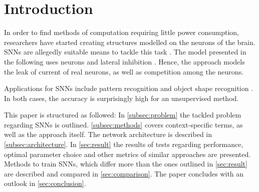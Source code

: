 \section{Introduction}

In order to find methods of computation requiring little power consumption, 
researchers have started creating structures modelled on the neurons of the brain.
\acp{SNN} are allegedly suitable means to tackle this task \cite{SNN}.
The model presented in the following uses  neurons and lateral inhibition \cite{SNN}.
Hence, the approach models the leak of current of real neurons, as well as competition among the neurons.

Applications for \acp{SNN} include pattern recognition \cite{SNN} and object shape recognition \cite{object_detection_SNN,multi_scale_STDP}.
In both cases, the accuracy is surprisingly high for an unsupervised method.

This paper is structured as followed:
In \autoref{subsec:problem} the tackled problem regarding \acp{SNN} is outlined.
\autoref{subsec:methods} covers context-specific terms, as well as the approach itself.
The network architecture is described in \autoref{subsec:architecture}.
In \autoref{sec:result} the results of tests regarding performance, optimal parameter choice and other metrics of similar approaches are presented.
Methods to train \acp{SNN}, which differ more than the ones outlined in \autoref{sec:result} are described and compared in \autoref{sec:comparison}.
The paper concludes with an outlook in \autoref{sec:conclusion}.